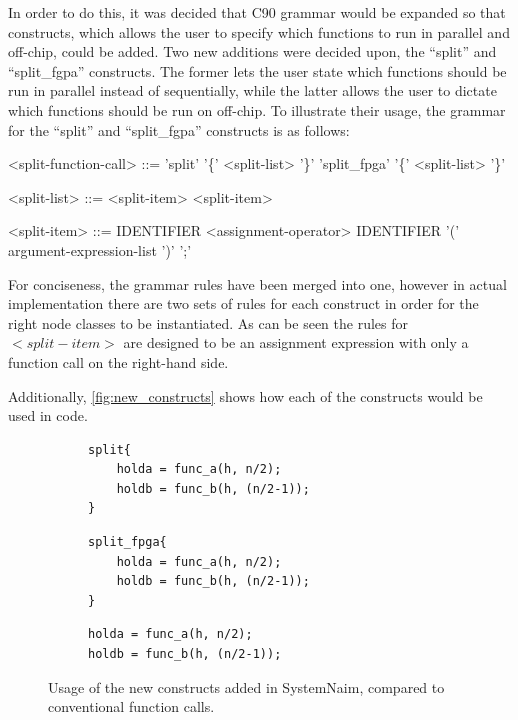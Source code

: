 In order to do this, it was decided that C90 grammar would be expanded so that constructs, which allows the user to specify which functions to run in parallel and off-chip, could be added. Two new additions were decided upon, the “split” and “split\_fgpa” constructs. The former lets the user state which functions should be run in parallel instead of sequentially, while the latter allows the user to dictate which functions should be run on off-chip. To illustrate their usage, the grammar for the “split” and “split\_fgpa” constructs is as follows:

\begin{grammar}
    <split-function-call> ::= 'split' '\{' <split-list> '\}'
    \alt 'split\_fpga' '\{' <split-list> '\}'

    <split-list> ::= <split-item>
     <split-item>

    <split-item> ::= IDENTIFIER <assignment-operator> IDENTIFIER '(' argument-expression-list ')' ';'
\end{grammar}

For conciseness, the grammar rules have been merged into one, however in actual implementation there are two sets of rules for each construct in order for the right node classes to be instantiated. As can be seen the rules for $<split-item>$ are designed to be an assignment expression with only a function call on the right-hand side.

Additionally, \autoref{fig:new_constructs} shows how each of the constructs would be used in code.

\begin{figure}[H]
\centering

\begin{subfigure}{0.45\textwidth}
    \begin{verbatim}
split{
    holda = func_a(h, n/2);
    holdb = func_b(h, (n/2-1));
}
    \end{verbatim}
\end{subfigure}
\begin{subfigure}{0.45\textwidth}
    \begin{verbatim}
split_fpga{
    holda = func_a(h, n/2);
    holdb = func_b(h, (n/2-1));
}
    \end{verbatim}
\end{subfigure}
\begin{subfigure}{0.38\textwidth}
    \centering
    \begin{verbatim}
holda = func_a(h, n/2);
holdb = func_b(h, (n/2-1));
    \end{verbatim}
\end{subfigure}
\caption{Usage of the new constructs added in SystemNaim, compared to conventional function calls.}
\label{fig:new_constructs}
\end{figure}

